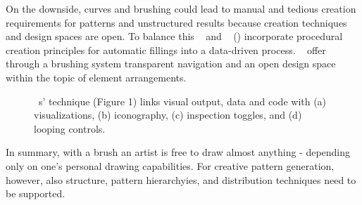 On the downside, curves and brushing could lead to manual and tedious creation requirements for patterns and unstructured results because creation techniques and design spaces are open. To balance this \citeauthor*{kazi_2012_vit}~\cite{kazi_2012_vit} and \citeauthor*{xing_2014_apr}~\cite{xing_2014_apr} () incorporate procedural creation principles for automatic fillings into a data-driven process. \citeauthor*{hsu_2020_aef}~\cite{hsu_2020_aef} offer through a brushing system transparent navigation and an open design space within the topic of element arrangements. 

\begin{figure}[H]
    \centering
    \caption{\label{fig:li_2020_sva}\citeauthor*{li_2020_sva}~\cite{li_2020_sva}s' technique (Figure 1) links visual output, data and code with (a) visualizations, (b) iconography, (c) inspection toggles, and (d) looping controls. \color{orange}{Status rights: requested}}
\end{figure}


In summary, with a brush an artist is free to draw almost anything - depending only on one's personal drawing capabilities. For creative pattern generation, however, also structure, pattern hierarchyies, and distribution techniques need to be supported. 



